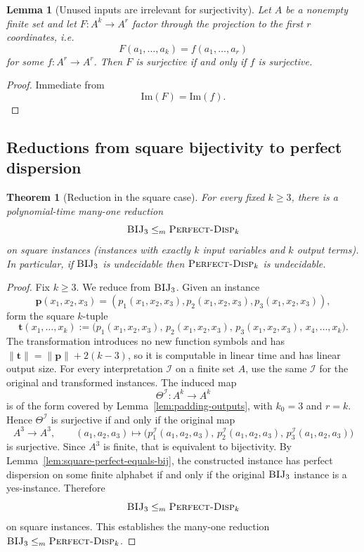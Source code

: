\documentclass[11pt]{article}
\newcommand{\instsize}[1]{\lVert #1\rVert}
\theoremstyle{definition}
\theoremstyle{plain}
\newtheorem{theorem}[definition]{Theorem}
\newtheorem{lemma}[definition]{Lemma}
\newcommand{\Img}{\mathrm{Im}}
\begin{document}
\begin{lemma}[Unused inputs are irrelevant for surjectivity]
\label{lem:unused-inputs}
Let $A$ be a nonempty finite set and let $F: A^k \to A^r$ factor through the projection to the first
$r$ coordinates, i.e.
\[
F(a_1,\dots,a_k)=f(a_1,\dots,a_r)
\]
for some $f:A^r\to A^r$.
Then $F$ is surjective if and only if $f$ is surjective.
\end{lemma}

\begin{proof}
Immediate from
\[
\Img(F)=\Img(f).
\]
\end{proof}

\subsection{Reductions from square bijectivity to perfect dispersion}
\label{subsec:reductions}

\begin{theorem}[Reduction in the square case]
\label{thm:reduction-kk}
For every fixed $k\ge 3$, there is a polynomial-time many-one reduction
\[
\textsc{BIJ}_3 \le_m \textsc{Perfect-Disp}_k
\]
on square instances (instances with exactly $k$ input variables and $k$ output terms).
In particular, if $\textsc{BIJ}_3$ is undecidable then $\textsc{Perfect-Disp}_k$ is undecidable.
\end{theorem}

\begin{proof}
Fix $k\ge 3$.
We reduce from $\textsc{BIJ}_3$.
Given an instance
\[
\mathbf p(x_1,x_2,x_3)=(p_1(x_1,x_2,x_3),p_2(x_1,x_2,x_3),p_3(x_1,x_2,x_3)),
\]
form the square $k$-tuple
\[
\mathbf t(x_1,\dots,x_k):=
\bigl(
p_1(x_1,x_2,x_3),\,
p_2(x_1,x_2,x_3),\,
p_3(x_1,x_2,x_3),\,
x_4,\dots,x_k
\bigr).
\]
The transformation introduces no new function symbols and has
$\instsize{\mathbf t}=\instsize{\mathbf p}+2(k-3)$, so it is computable in linear time and has linear output
size.  For every interpretation $\mathcal I$ on a finite set $A$, use the same $\mathcal I$ for the original
and transformed instances.  The induced map
\[
\Theta^\mathcal I:A^k\to A^k
\]
is of the form covered by Lemma~\ref{lem:padding-outputs}, with $k_0=3$ and $r=k$.
Hence $\Theta^\mathcal I$ is surjective if and only if the original map
\[
A^3\to A^3,\qquad
(a_1,a_2,a_3)\mapsto
\bigl(
p_1^\mathcal I(a_1,a_2,a_3),\,
p_2^\mathcal I(a_1,a_2,a_3),\,
p_3^\mathcal I(a_1,a_2,a_3)
\bigr)
\]
is surjective.
Since $A^3$ is finite, that is equivalent to bijectivity.
By Lemma~\ref{lem:square-perfect-equals-bij}, the constructed instance has perfect dispersion on some finite
alphabet if and only if the original $\textsc{BIJ}_3$ instance is a yes-instance.
Therefore
\[
\textsc{BIJ}_3 \le_m \textsc{Perfect-Disp}_k
\]
on square instances.
This establishes the many-one reduction $\textsc{BIJ}_3 \le_m \textsc{Perfect-Disp}_k$.
\end{proof}
\end{document}
